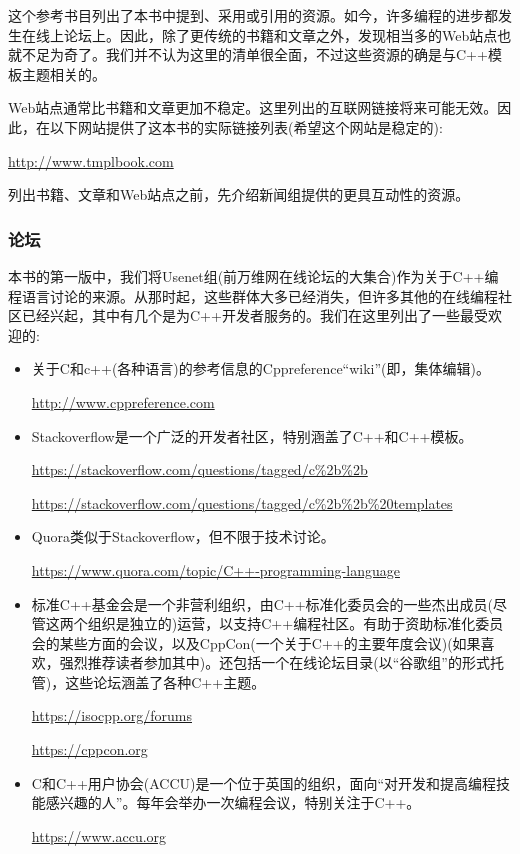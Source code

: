 
这个参考书目列出了本书中提到、采用或引用的资源。如今，许多编程的进步都发生在线上论坛上。因此，除了更传统的书籍和文章之外，发现相当多的Web站点也就不足为奇了。我们并不认为这里的清单很全面，不过这些资源的确是与C++模板主题相关的。

Web站点通常比书籍和文章更加不稳定。这里列出的互联网链接将来可能无效。因此，在以下网站提供了这本书的实际链接列表(希望这个网站是稳定的):

\url{http://www.tmplbook.com}

列出书籍、文章和Web站点之前，先介绍新闻组提供的更具互动性的资源。

\subsubsection*{论坛}

本书的第一版中，我们将Usenet组(前万维网在线论坛的大集合)作为关于C++编程语言讨论的来源。从那时起，这些群体大多已经消失，但许多其他的在线编程社区已经兴起，其中有几个是为C++开发者服务的。我们在这里列出了一些最受欢迎的:

\begin{itemize}
\item 
关于C和c++(各种语言)的参考信息的Cppreference“wiki”(即，集体编辑)。

\url{http://www.cppreference.com}

\item
Stackoverflow是一个广泛的开发者社区，特别涵盖了C++和C++模板。

\url{https://stackoverflow.com/questions/tagged/c%2b%2b}

\url{https://stackoverflow.com/questions/tagged/c%2b%2b%20templates}

\item
Quora类似于Stackoverflow，但不限于技术讨论。

\url{https://www.quora.com/topic/C++-programming-language}

\item
标准C++基金会是一个非营利组织，由C++标准化委员会的一些杰出成员(尽管这两个组织是独立的)运营，以支持C++编程社区。有助于资助标准化委员会的某些方面的会议，以及CppCon(一个关于C++的主要年度会议)(如果喜欢，强烈推荐读者参加其中)。还包括一个在线论坛目录(以“谷歌组”的形式托管)，这些论坛涵盖了各种C++主题。

\url{https://isocpp.org/forums}

\url{https://cppcon.org}

\item
C和C++用户协会(ACCU)是一个位于英国的组织，面向“对开发和提高编程技能感兴趣的人”。每年会举办一次编程会议，特别关注于C++。

\url{https://www.accu.org}
\end{itemize}

